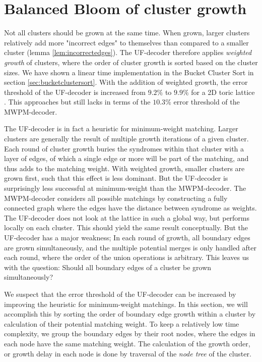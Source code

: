 \section{Balanced Bloom of cluster growth}

Not all clusters should be grown at the same time. When grown, larger clusters relatively add more "incorrect edges" to themselves than compared to a smaller cluster (lemma \ref{lem:incorrectedges}). The UF-decoder therefore applies \emph{weighted growth} of clusters, where the order of cluster growth is sorted based on the cluster sizes. We have shown a linear time implementation in the Bucket Cluster Sort in section \ref{sec:bucketclustersort}. With the addition of weighted growth, the error threshold of the UF-decoder is increased from $9.2\%$ to $9.9\%$ for a 2D toric lattice \cite{delfosse2017almost}. This approaches but still lacks in terms of the $10.3\%$ error threshold of the MWPM-decoder.

The UF-decoder is in fact a heuristic for minimum-weight matching. Larger clusters are generally the result of multiple growth iterations of a given cluster. Each round of cluster growth buries the syndromes within that cluster with a layer of edges, of which a single edge or more will be part of the matching, and thus adds to the matching weight. With weighted growth, smaller clusters are grown first, such that this effect is less dominant. But the UF-decoder is surprisingly less successful at minimum-weight than the MWPM-decoder. The MWPM-decoder considers all possible matchings by constructing a fully connected graph where the edges have the distance between syndrome as weights. The UF-decoder does not look at the lattice in such a global way, but performs locally on each cluster. This should yield the same result conceptually. But the UF-decoder has a major weakness; In each round of growth, all boundary edges are grown simultaneously, and the multiple potential merges is only handled after each round, where the order of the union operations is arbitrary. This leaves us with the question: Should all boundary edges of a cluster be grown simultaneously?

We suspect that the error threshold of the UF-decoder can be increased by improving the heuristic for minimum-weight matchings. In this section, we will accomplish this by sorting the order of boundary edge growth within a cluster by calculation of their potential matching weight. To keep a relatively low time complexity, we group the boundary edges by their root nodes, where the edges in each node have the same matching weight. The calculation of the growth order, or growth delay in each node is done by traversal of the \emph{node tree} of the cluster.


